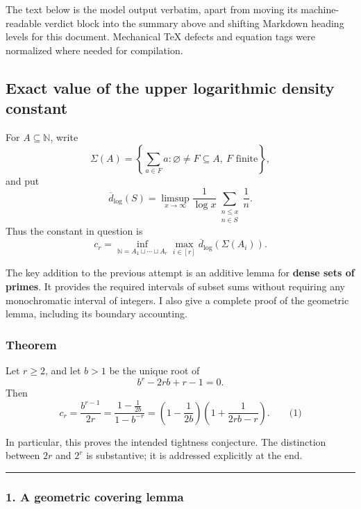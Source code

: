 \documentclass[
  11pt,
  a4paper,
]{article}
\begin{document}
The text below is the model output verbatim, apart from moving its
machine-readable verdict block into the summary above and shifting
Markdown heading levels for this document. Mechanical TeX defects and
equation tags were normalized where needed for compilation.

\subsection{Exact value of the upper logarithmic density
constant}\label{exact-value-of-the-upper-logarithmic-density-constant}

For \(A\subseteq\mathbb N\), write \[
\Sigma(A)=
\left\{\sum_{a\in F}a:
\varnothing\ne F\subseteq A,\ F\text{ finite}\right\},
\] and put \[
\overline d_{\log}(S)
=\limsup_{x\to\infty}
\frac{1}{\log x}\sum_{\substack{n\le x\\n\in S}}\frac1n.
\] Thus the constant in question is \[
c_r=\inf_{\mathbb N=A_1\sqcup\cdots\sqcup A_r}
\max_{i\in[r]}\overline d_{\log}(\Sigma(A_i)).
\]

The key addition to the previous attempt is an additive lemma for
\textbf{dense sets of primes}. It provides the required intervals of
subset sums without requiring any monochromatic interval of integers. I
also give a complete proof of the geometric lemma, including its
boundary accounting.

\subsubsection{Theorem}\label{theorem}

Let \(r\ge2\), and let \(b>1\) be the unique root of \[
b^r-2rb+r-1=0.
\] Then \[
\boxed{\displaystyle
c_r=\frac{b^{r-1}}{2r}
=\frac{1-\frac1{2b}}{1-b^{-r}}
=\left(1-\frac1{2b}\right)
 \left(1+\frac1{2rb-r}\right).}
\qquad\text{(1)}
\]

In particular, this proves the intended tightness conjecture. The
distinction between \(2r\) and \(2^r\) is substantive; it is addressed
explicitly at the end.

\begin{center}\rule{0.5\linewidth}{0.5pt}\end{center}

\subsubsection{1. A geometric covering
lemma}\label{a-geometric-covering-lemma}
\end{document}
